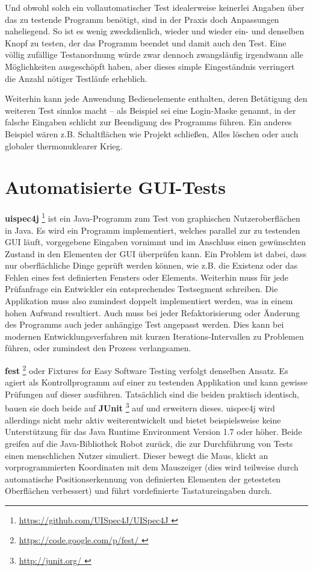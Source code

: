Und obwohl solch ein vollautomatischer Test idealerweise keinerlei Angaben
über das zu testende Programm benötigt, sind in der Praxis doch Anpassungen
naheliegend. So ist es wenig zweckdienlich, wieder und wieder ein- und 
denselben Knopf zu testen,
der das Programm beendet und damit auch den Test. Eine völlig zufällige
Testanordnung würde zwar dennoch zwangsläufig irgendwann alle Möglichkeiten
ausgeschöpft haben, aber dieses simple Eingeständnis verringert die
Anzahl nötiger Testläufe erheblich.

Weiterhin kann jede Anwendung Bedienelemente enthalten, deren Betätigung
den weiteren Test sinnlos macht -- als Beispiel sei eine Login-Maske genannt,
in der falsche Eingaben schlicht zur Beendigung des Programms führen.
Ein anderes Beispiel wären z.B. Schaltflächen wie
\glqq{}Projekt schließen\grqq{}, \glqq{}Alles löschen\grqq{} oder auch 
\glqq{}globaler thermonuklearer Krieg\grqq{}.


\section{Automatisierte GUI-Tests}\label{section:automatedguitesting}


\textbf{uispec4j} \footnote{\url{ https://github.com/UISpec4J/UISpec4J }} ist ein Java-Programm 
zum Test von graphischen Nutzeroberflächen
in Java. Es wird ein Programm implementiert, welches parallel zur zu testenden GUI läuft,
vorgegebene Eingaben vornimmt und im Anschluss einen gewünschten Zustand in den Elementen der GUI
überprüfen kann. Ein Problem ist dabei, dass nur oberflächliche Dinge geprüft werden können,
wie z.B. die Existenz oder das Fehlen eines fest definierten Fensters oder Elements. Weiterhin muss für jede
Prüfanfrage ein Entwickler ein entsprechendes Testsegment schreiben. Die Applikation muss also
zumindest doppelt implementiert werden, was in einem hohen Aufwand resultiert. Auch muss bei jeder
Refaktorisierung oder Änderung des Programms auch jeder anhängige Test angepasst werden.
Dies kann bei modernen Entwicklungsverfahren mit kurzen Iterations-Intervallen zu Problemen führen,
oder zumindest den Prozess verlangsamen.


\vspace{0.5cm}

\textbf{fest} \footnote{\url{ https://code.google.com/p/fest/ }} oder 
\glqq{}Fixtures for Easy Software Testing\grqq{} verfolgt denselben Ansatz.
Es agiert als Kontrollprogramm auf einer zu testenden Applikation und kann gewisse Prüfungen
auf dieser ausführen. Tatsächlich sind die beiden praktisch identisch, bauen sie doch beide
auf \textbf{JUnit} \footnote{\url{ http://junit.org/ }} auf und erweitern dieses.
uispec4j wird allerdings nicht mehr aktiv weiterentwickelt und bietet
beispielsweise keine Unterstützung für das Java Runtime Environment Version \glqq{}1.7\grqq{}
oder höher. Beide greifen auf die Java-Bibliothek \glqq{}Robot\grqq{} zurück,
die zur Durchführung von Tests einen menschlichen Nutzer simuliert. Dieser 
bewegt die Maus, klickt an vorprogrammierten Koordinaten mit dem Mauszeiger
(dies wird teilweise durch automatische Positionserkennung von definierten Elementen
der getesteten Oberflächen verbessert) und führt vordefinierte Tastatureingaben durch.


